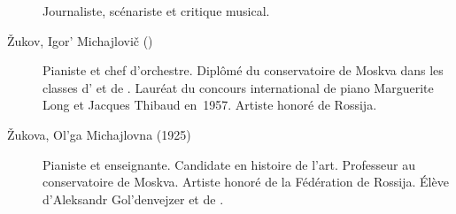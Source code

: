 \begin{description}
 Journaliste, scénariste et critique musical.
 \item[Žukov, Igor' Michajlovič (\Dates{1936}{2018})]%
 Pianiste et chef d'orchestre.
 Diplômé du conservatoire de Moskva dans les classes d'\EGuilels{} et de
 \HNeuhaus{}.
 Lauréat du concours international de piano Marguerite Long et Jacques
 Thibaud en~1957.
 Artiste honoré de Rossija.
 \item[Žukova, Ol'ga Michajlovna (1925\dvsborn{})]%
 Pianiste et enseignante.
 Candidate en histoire de l'art.
 Professeur au conservatoire de Moskva.
 Artiste honoré de la Fédération de Rossija.
 Élève d'\hbox{Aleksandr} Gol'denvejzer et de \VSofronitsky{}.
\end{description}
